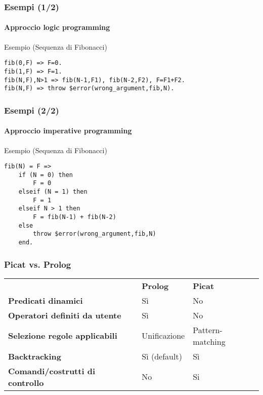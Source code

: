 \documentclass{beamer}
\begin{document}
\begin{frame}[fragile]
  \frametitle{Esempi (1/2)}
  \framesubtitle{Approccio logic programming}
  \begin{exampleblock}{Esempio (Sequenza di Fibonacci)}
\begin{verbatim}
fib(0,F) => F=0.
fib(1,F) => F=1.
fib(N,F),N>1 => fib(N-1,F1), fib(N-2,F2), F=F1+F2.
fib(N,F) => throw $error(wrong_argument,fib,N).
\end{verbatim}
  \end{exampleblock}
\end{frame}


\begin{frame}[fragile]
  \frametitle{Esempi (2/2)}
  \framesubtitle{Approccio imperative programming}
  \begin{exampleblock}{Esempio (Sequenza di Fibonacci)}
\begin{verbatim}
fib(N) = F =>
    if (N = 0) then
        F = 0
    elseif (N = 1) then
        F = 1
    elseif N > 1 then
        F = fib(N-1) + fib(N-2)
    else 
        throw $error(wrong_argument,fib,N)
    end.
\end{verbatim}
  \end{exampleblock}
\end{frame}


\begin{frame}[fragile]
  \frametitle{Picat vs. Prolog}
  \begin{table}
    \begin{tabular}{l l l}
      & \textbf{Prolog} & \textbf{Picat} \\
      \addlinespace
      \textbf{Predicati dinamici} & Sì & No \\
      \textbf{Operatori definiti da utente} & Sì & No \\
      \textbf{Selezione regole applicabili} & Unificazione & Pattern-matching \\
      \textbf{Backtracking} & Sì (default) & Sì \\
      \textbf{Comandi/costrutti di controllo} & No & Si
    \end{tabular}
  \end{table}
\end{frame}

\end{document}
